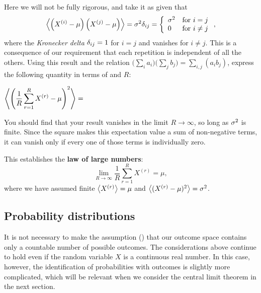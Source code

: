 Here we will not be fully rigorous, and take it as given that
\begin{equation*}
  \left\langle \left(X^{(i)} - \mu\right)\left(X^{(j)} - \mu\right) \right\rangle = \sigma^2 \delta_{ij} = \left\{\begin{array}{ll}\sigma^2 & \mbox{for } i = j \\ 0 & \mbox{for } i \ne j\end{array}\right.,
\end{equation*}
where the \textit{Kronecker delta} $\delta_{ij} = 1$ for $i = j$ and vanishes for $i \ne j$.
This is a consequence of our requirement that each repetition is independent of all the others.
Using this result and the relation $\big(\sum_i a_i\big)\big(\sum_j b_j\big) = \sum_{i, j} \left(a_i b_j\right)$, express the following quantity in terms of \si and $R$:
\begin{mdframed}
  $\displaystyle \left\langle \left(\frac{1}{R} \sum_{r = 1}^R X^{(r)} - \mu\right)^2 \right\rangle = $ \\[200 pt]
\end{mdframed}
You should find that your result vanishes in the limit $R \to \infty$, so long as $\sigma^2$ is finite.
Since the square makes this expectation value a sum of non-negative terms, it can vanish only if every one of those terms is individually zero.

\begin{shaded}
  This establishes the \textbf{law of large numbers}:
  \begin{equation}
    \lim_{R \to \infty} \frac{1}{R} \sum_{r = 1}^R X^{(r)} = \mu,
  \end{equation}
  where we have assumed finite $\left\langle X^{(r)} \right\rangle = \mu$ and $\left\langle (X^{(r)} - \mu)^2 \right\rangle = \sigma^2$.
\end{shaded}



\subsection{\label{sec:probdist}Probability distributions}
It is not necessary to make the assumption () that our outcome space contains only a countable number of possible outcomes.
The considerations above continue to hold even if the random variable $X$ is a continuous real number.
In this case, however, the identification of probabilities with outcomes is slightly more complicated, which will be relevant when we consider the central limit theorem in the next section.

